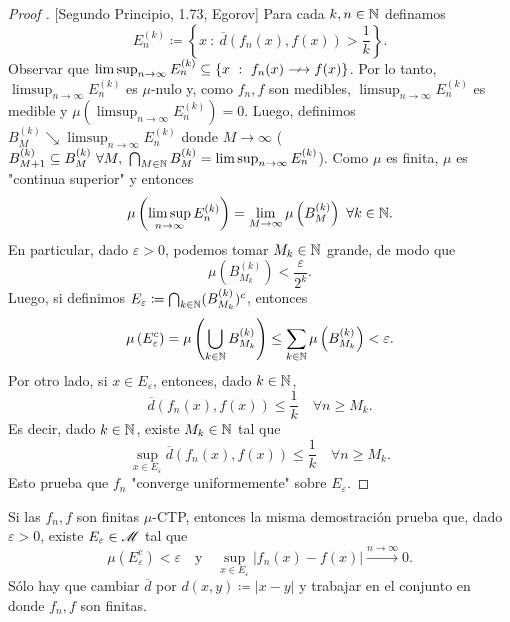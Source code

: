 \begin{proof}[Proof ][Segundo Principio, 1.73, Egorov]
	Para cada $k,n \in \mathbb{N}$ definamos
	\[ E_{n}^{(k)} \coloneq \left\{x \ : \ \overline{d}(f_{n}(x),f(x))> \frac{1}{k}\right\}. \]
	Observar que $\limsup_{n \to \infty} E_{n}^{(k)} \subseteq \{x \ : \ f_n(x) \longarrownot\longrightarrow f(x)\}$. Por lo tanto, $\limsup_{n \to \infty} E_{n}^{(k)}$ es $\mu$-nulo y, como $f_{n},f$ son medibles, $\limsup_{n \to \infty} E_{n}^{(k)}$ es medible y $\mu(\limsup_{n \to \infty} E_{n}^{(k)}) = 0$. Luego, definimos $B_{M}^{(k)} \searrow \limsup_{n \to \infty} E_{n}^{(k)}$ donde $M \to \infty$ ($B_{M+1}^{(k)} \subseteq B_{M}^{(k)} \ \forall M,\ \bigcap_{M\in\N} B_{M}^{(k)} = \limsup_{n \to \infty} E_{n}^{(k)}$). Como $\mu$ es finita, $\mu$ es "continua superior" y entonces
	\[ \mu \left(\limsup_{n \to \infty} E_{n}^{(k)}\right) = \lim_{M \to \infty} \mu\left(B_{M}^{(k)}\right) \ \forall k \in \mathbb{N}. \]
	En particular, dado $\varepsilon{} > 0$, podemos tomar $M_{k} \in \mathbb{N}$ grande, de modo que
	\[ \mu \left( B_{M_{k}}^{(k)} \right) < \frac{\varepsilon}{2^{k}}. \]
	Luego, si definimos $E_{\varepsilon} \coloneq \bigcap_{k\in\mathbb{N}} (B_{M_{k}}^{(k)})^{c}$, entonces
	\[ \mu\left(E_{\varepsilon}^{c}\right) = \mu\left(\bigcup_{k\in\mathbb{N}} B_{M_{k}}^{(k)}\right) \leq \sum_{k\in\mathbb{N}} \mu\left(B_{M_{k}}^{(k)}\right) < \varepsilon. \]
	Por otro lado, si $x \in E_{\varepsilon}$, entonces, dado $k \in \mathbb{N}$,
	\[ \overline{d}(f_n(x), f(x)) \leq \frac{1}{k} \quad \forall n \geq M_{k}. \]
	Es decir, dado $k \in \mathbb{N}$, existe $M_{k} \in \mathbb{N}$ tal que
	\[ \sup_{x \in E_{\varepsilon}} \overline{d}(f_n(x), f(x)) \leq \frac{1}{k} \quad \forall n \geq M_{k}. \]
	Esto prueba que $f_n$ "converge uniformemente" sobre $E_{\varepsilon}$.
\end{proof}

\begin{remark}[Importante!]
	Si las $f_{n},f$ son finitas $\mu$-CTP, entonces la misma demostración prueba que, dado $\varepsilon > 0$, existe $E_{\varepsilon} \in \mathscr{M}$ tal que
	\[ \mu(E_{\varepsilon}^{c}) < \varepsilon \quad \text{y} \quad \sup_{x \in E_{\varepsilon}} |f_n(x) - f(x)| \stackrel{n \to \infty}{\longrightarrow} 0. \]
	Sólo hay que cambiar $\overline{d}$ por $d(x,y) \coloneq |x-y|$ y trabajar en el conjunto en donde $f_{n},f$ son finitas.
\end{remark}
